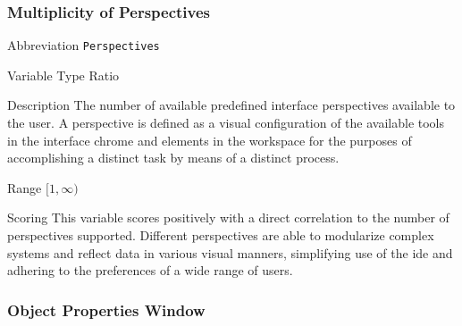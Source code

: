 \subsubsection{Multiplicity of Perspectives}
\label{subsubsec:perspectives}

\begin{AlignedDesc}
  \item[Abbreviation] \texttt{Perspectives}

  \item[Variable Type] Ratio

  \item[Description] The number of available predefined interface
  perspectives available to the user. A perspective is defined as a visual
  configuration of the available tools in the interface chrome and elements
  in the workspace for the purposes of accomplishing a distinct task by
  means of a distinct process.

  \item[Range] $[1 , \infty)$

  \item[Scoring] This variable scores positively with a direct correlation
  to the number of perspectives supported. Different perspectives are able
  to modularize complex systems and reflect data in various visual manners,
  simplifying use of the \ac{ide} and adhering to the preferences of a wide
  range of users.

\end{AlignedDesc}

\subsubsection{Object Properties Window}
\label{subsubsec:properties}

